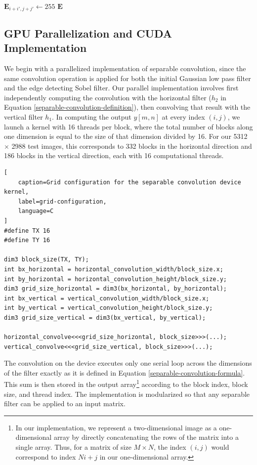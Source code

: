\documentclass[journal]{IEEEtran}
\begin{document}
\begin{algorithm}[h]
{{			\nl {} {
				 {
					 {
						\nl {} {
							\nl $\boldsymbol{E}_{i + i', j + j'} \gets 255$\;
						}
					}
				}
			}
		}
	}
	\nl \Return $\boldsymbol{E}$\;
	\
\end{algorithm}

\subsection{GPU Parallelization and CUDA Implementation}
We begin with a parallelized implementation of separable convolution, since the same convolution operation is applied for both the initial Gaussian low pass filter and the edge detecting Sobel filter. Our parallel implementation involves first independently computing the convolution with the horizontal filter ($h_2$ in Equation \eqref{separable-convolution-definition}), then convolving that result with the vertical filter $h_1$. In computing the output $y[m, n]$ at every index $(i, j)$, we launch a kernel with 16 threads per block, where the total number of blocks along one dimension is equal to the size of that dimension divided by 16. For our 5312 $\times$ 2988 test images, this corresponds to 332 blocks in the horizontal direction and 186 blocks in the vertical direction, each with 16 computational threads.
\begin{lstlisting}[
	caption=Grid configuration for the separable convolution device kernel,
	label=grid-configuration,
	language=C
]
#define TX 16
#define TY 16

dim3 block_size(TX, TY);
int bx_horizontal = horizontal_convolution_width/block_size.x;
int by_horizontal = horizontal_convolution_height/block_size.y;
dim3 grid_size_horizontal = dim3(bx_horizontal, by_horizontal);
int bx_vertical = vertical_convolution_width/block_size.x;
int by_vertical = vertical_convolution_height/block_size.y;
dim3 grid_size_vertical = dim3(bx_vertical, by_vertical);

horizontal_convolve<<<grid_size_horizontal, block_size>>>(...);
vertical_convolve<<<grid_size_vertical, block_size>>>(...);
\end{lstlisting}
\par The convolution on the device executes only one serial loop across the dimensions of the filter exactly as it is defined in Equation \eqref{separable-convolution-formula}. This sum is then stored in the output array\footnote{In our implementation, we represent a two-dimensional image as a one-dimensional array by directly concatenating the rows of the matrix into a single array. Thus, for a matrix of size $M \times N$, the index $(i, j)$ would correspond to index $Ni + j$ in our one-dimensional array.} according to the block index, block size, and thread index. The implementation is modularized so that any separable filter can be applied to an input matrix.
\end{document}
